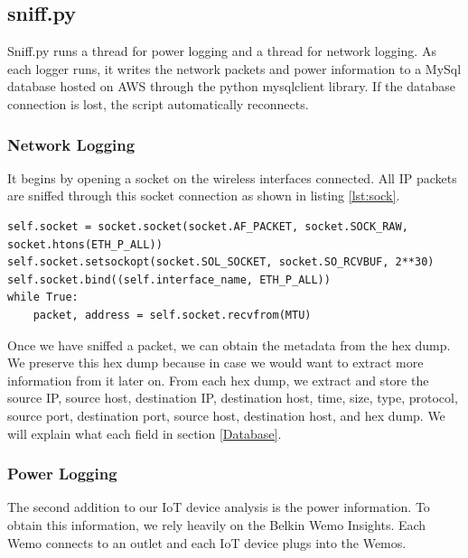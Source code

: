 \subsection{sniff.py}
\label{sniff.py}

Sniff.py runs a thread for power logging and a thread for network logging. As each logger runs, it writes the network packets and power information to a MySql database hosted on AWS through the python mysqlclient \cite{mysqlclient} library. If the database connection is lost, the script automatically reconnects.

\subsubsection{Network Logging}

It begins by opening a socket on the wireless interfaces connected. All IP packets are sniffed through this socket connection as shown in listing \ref{lst:sock}.

\begin{minipage}{\textwidth}
\begin{lstlisting}[label={lst:sock},caption={Open and Read from a Socket},captionpos=b]
self.socket = socket.socket(socket.AF_PACKET, socket.SOCK_RAW, socket.htons(ETH_P_ALL))
self.socket.setsockopt(socket.SOL_SOCKET, socket.SO_RCVBUF, 2**30)
self.socket.bind((self.interface_name, ETH_P_ALL))
while True:
    packet, address = self.socket.recvfrom(MTU)
\end{lstlisting}
\end{minipage}

Once we have sniffed a packet, we can obtain the metadata from the hex dump. We preserve this hex dump because in case we would want to extract more information from it later on. From each hex dump, we extract and store the source IP, source host, destination IP, destination host, time, size, type, protocol, source port, destination port, source host, destination host, and hex dump. We will explain what each field in section \ref{Database}.

\subsubsection{Power Logging}

The second addition to our IoT device analysis is the power information. To obtain this information, we rely heavily on the Belkin Wemo Insights. Each Wemo connects to an outlet and each IoT device plugs into the Wemos.

